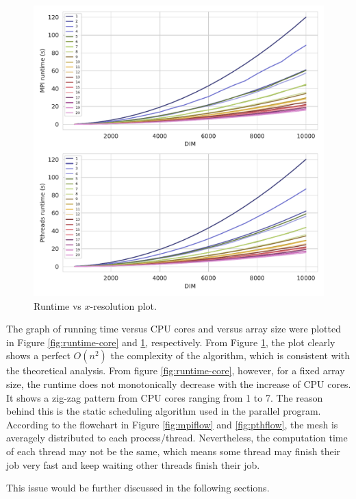 \documentclass[twoside,12pt]{article}
\theoremstyle{definition}
\theoremstyle{remark}
\begin{document}
\begin{figure}[t!]
    \centering
    \includegraphics[width=\textwidth]{../analysis/runtime-dim.pdf}
    \caption{Runtime vs $x$-resolution plot.}
    \label{fig:runtime-dim}
\end{figure}

The graph of running time versus CPU cores and versus array size were plotted
in Figure \ref{fig:runtime-core} and \ref{fig:runtime-dim}, respectively.
From Figure \ref{fig:runtime-dim}, the plot clearly shows a perfect $O(n^2)$
the complexity of the algorithm, which is consistent with the theoretical analysis.
From figure \ref{fig:runtime-core}, however, for a fixed array size, 
the runtime does not monotonically decrease with the increase of CPU cores.
It shows a zig-zag pattern from CPU cores ranging from 1 to 7.
The reason behind this is the static scheduling algorithm used in the
parallel program.
According to the flowchart in Figure \ref{fig:mpiflow} and \ref{fig:pthflow},
the mesh is averagely distributed to each process/thread.
Nevertheless, the computation time of each thread may not be the same,
which means some thread may finish their job very fast and keep waiting
other threads finish their job.

This issue would be further discussed in the following sections.


\newpage
\end{document}
